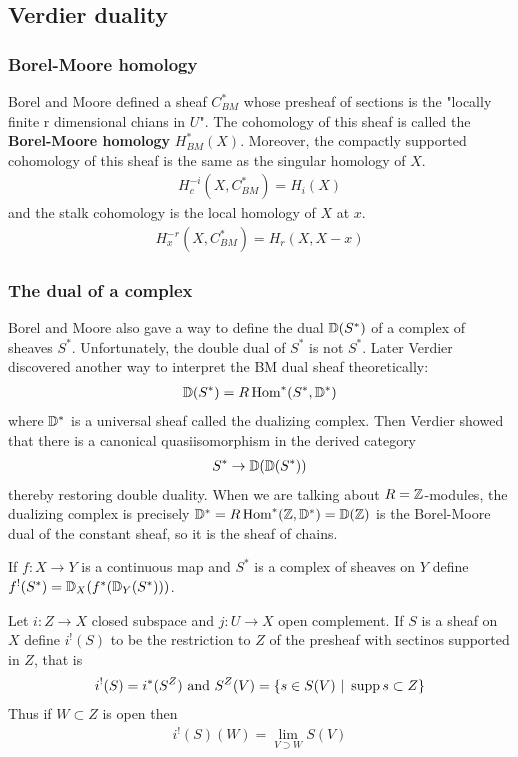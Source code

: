 \documentclass[12pt]{article}
\begin{document}
\subsection{Verdier duality}
\subsubsection{Borel-Moore homology}
Borel and Moore defined a sheaf $C^*_{BM}$ whose presheaf of sections is the 
"locally finite r dimensional chians in $U$". The cohomology of this sheaf is called the 
\textbf{Borel-Moore homology} $H^*_{BM}(X)$. Moreover,
the compactly supported cohomology of this sheaf is the same as the singular homology of $X$.
\begin{align*}
    H^{-i}_c(X,C^*_{BM}) = H_i(X)
\end{align*} and the stalk cohomology is the local homology of $X$ at $x$. \begin{align*}
    H^{-r}_x(X,C^*_{BM}) = H_r(X,X-x)
\end{align*}

\subsubsection{The dual of a complex}
Borel and Moore also gave a way to define the dual $\mathbb{D}(S^*)$ of a complex of sheaves $S^*$.
Unfortunately, the double dual of $S^*$ is not $S^*$. Later
Verdier discovered another way to interpret the BM dual sheaf theoretically:
\begin{align*}
    \mathbb{D}(S^*) = R\operatorname{Hom}^*(S^*,\mathbb{D}^*)
\end{align*} where $\mathbb{D}^*$ is a universal sheaf called the dualizing complex. Then 
Verdier showed that there is a canonical quasiisomorphism
in the derived category \begin{align*}
    S^* \to \mathbb{D}(\mathbb{D}(S^*))
\end{align*} thereby restoring double duality. When we are talking about $R=\mathbb{Z}$-modules,
the dualizing complex is precisely $\mathbb{D}^* =  R\operatorname{Hom}^*(\mathbb{Z},\mathbb{D}^*) = \mathbb{D}(\mathbb{Z})$ is the 
Borel-Moore dual of the constant sheaf, so it is the sheaf of chains.

\begin{definition}
    If $f:X\to Y$ is a continuous map and $S^*$ is a complex of sheaves on $Y$
    define $f^!(S^*) = \mathbb{D}_X(f^*(\mathbb{D}_Y(S^*)))$.
\end{definition}

\begin{definition}
    Let $i:Z\to X$ closed subspace and $j:U\to X$ open complement. 
    If $S$ is a sheaf on $X$ define $i^!(S)$ to be the restriction to $Z$ of the 
    presheaf with sectinos supported in $Z$, that is \begin{align*}
        i^!(S) = i^*(S^Z) \text{ and } S^Z(V) = \{s\in S(V) \ \vert \  \operatorname{supp} s \subset Z\}
    \end{align*} Thus if $W\subset Z$ is open then \begin{align*}
        i^!(S)(W) = \lim_{V\supset W} S(V)
    \end{align*}
\end{definition}
\end{document}
